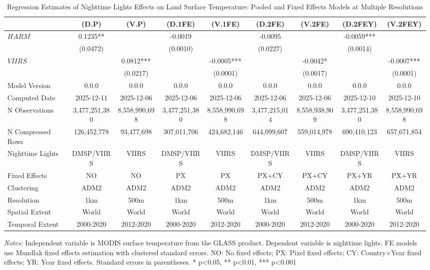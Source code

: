 \begin{table}[htbp]
\centering
\footnotesize
\caption{Regression Estimates of Nighttime Lights Effects on Land Surface Temperature: Pooled and Fixed Effects Models at Multiple Resolutions}
\begin{tabular}{lcccccccc}
\toprule
 & (D.P) & (V.P) & (D.1FE) & (V.1FE) & (D.2FE) & (V.2FE) & (D.2FEY) & (V.2FEY) \\
\midrule
$HARM$ & 0.1235** &  & -0.0019 &  & -0.0095 &  & -0.0059*** &  \\
 & (0.0472) &  & (0.0010) &  & (0.0227) &  & (0.0014) &  \\
$VIIRS$ &  & 0.0812*** &  & -0.0005*** &  & -0.0042* &  & -0.0007*** \\
 &  & (0.0217) &  & (0.0001) &  & (0.0017) &  & (0.0001) \\
\midrule
Model Version & 0.0.0 & 0.0.0 & 0.0.0 & 0.0.0 & 0.0.0 & 0.0.0 & 0.0.0 & 0.0.0 \\
Computed Date & 2025-12-11 & 2025-12-06 & 2025-12-06 & 2025-12-06 & 2025-12-06 & 2025-12-06 & 2025-12-10 & 2025-12-10 \\
N Observations & 3,477,251,380 & 8,558,990,698 & 3,477,251,380 & 8,558,990,698 & 3,477,215,014 & 8,558,938,909 & 3,477,251,380 & 8,558,990,698 \\
N Compressed Rows & 126,452,778 & 93,477,698 & 307,011,706 & 424,682,146 & 644,099,607 & 559,014,978 & 690,410,123 & 657,671,854 \\
\midrule
Nighttime Lights & DMSP/VIIRS & VIIRS & DMSP/VIIRS & VIIRS & DMSP/VIIRS & VIIRS & DMSP/VIIRS & VIIRS \\
Fixed Effects & NO & NO & PX & PX & PX+CY & PX+CY & PX+YR & PX+YR \\
Clustering & ADM2 & ADM2 & ADM2 & ADM2 & ADM2 & ADM2 & ADM2 & ADM2 \\
\cmidrule(lr){1-9}
Resolution & 1km & 500m & 1km & 500m & 1km & 500m & 1km & 500m \\
Spatial Extent & World & World & World & World & World & World & World & World \\
Temporal Extent & 2000-2020 & 2012-2020 & 2000-2020 & 2012-2020 & 2000-2020 & 2012-2020 & 2000-2020 & 2012-2020 \\
\bottomrule
\end{tabular}
\begin{threeparttable}
\begin{tablenotes}\small
\item \textit{Notes:} Independent variable is MODIS surface temperature from the GLASS product. Dependent variable is nighttime lights. FE models use Mundlak fixed effects estimation with clustered standard errors. NO: No fixed effects; PX: Pixel fixed effects; CY: Country×Year fixed effects; YR: Year fixed effects. Standard errors in parentheses. * p<0.05, ** p<0.01, *** p<0.001
\end{tablenotes}
\end{threeparttable}
\end{table}